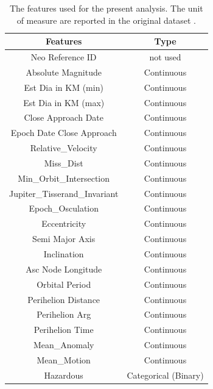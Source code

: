 \documentclass[12pt,%
               a4paper,%
               oneside,openany,%
               titlepage,%
               headinclude,footinclude,%
               BCOR5mm,%
               cleardoublepage=empty,%
               tablecaptionabove,%
               floatperchapter,
               ]{scrreprt}                 %
\begin{document}
\begin{table}[]
\caption{The features used for the present analysis. The unit of measure are reported in the original dataset \cite{kaggle_dataset}.}
\begin{center}
\begin{tabular}{c|c}
\hline
\textbf{Features}             & \textbf{Type}        \\ \hline
Neo Reference ID              & not used             \\ \hline
Absolute Magnitude            & Continuous           \\ \hline
Est Dia in KM (min)           & Continuous           \\ \hline
Est Dia in KM (max)           & Continuous           \\ \hline
Close Approach Date           & Continuous           \\ \hline
Epoch Date Close Approach     & Continuous           \\ \hline
Relative\_Velocity            & Continuous           \\ \hline
Miss\_Dist                    & Continuous           \\ \hline
Min\_Orbit\_Intersection      & Continuous           \\ \hline
Jupiter\_Tisserand\_Invariant & Continuous           \\ \hline
Epoch\_Osculation             & Continuous           \\ \hline
Eccentricity                  & Continuous           \\ \hline
Semi Major Axis               & Continuous           \\ \hline
Inclination                   & Continuous           \\ \hline
Asc Node Longitude            & Continuous           \\ \hline
Orbital Period                & Continuous           \\ \hline
Perihelion Distance           & Continuous           \\ \hline
Perihelion Arg                & Continuous           \\ \hline
Perihelion Time               & Continuous           \\ \hline
Mean\_Anomaly                 & Continuous           \\ \hline
Mean\_Motion                  & Continuous           \\ \hline
Hazardous                     & Categorical (Binary)
\end{tabular}
\end{center}
\label{tab_features}
\end{table}
\end{document}
